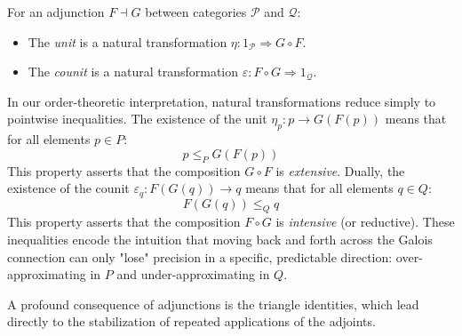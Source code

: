 \begin{definition}
For an adjunction $F \dashv G$ between categories $\mathcal{P}$ and $\mathcal{Q}$:
\begin{itemize}
    \item The \emph{unit} is a natural transformation $\eta: 1_{\mathcal{P}} \Rightarrow G \circ F$.
    \item The \emph{counit} is a natural transformation $\varepsilon: F \circ G \Rightarrow 1_{\mathcal{Q}}$.
\end{itemize}
\end{definition}

In our order-theoretic interpretation, natural transformations reduce simply to pointwise inequalities. The existence of the unit $\eta_p: p \to G(F(p))$ means that for all elements $p \in P$:
\begin{equation}
\label{eq:unit_inequality}
p \leq_P G(F(p))
\end{equation}
This property asserts that the composition $G \circ F$ is \emph{extensive}. 
Dually, the existence of the counit $\varepsilon_q: F(G(q)) \to q$ means that for all elements $q \in Q$:
\begin{equation}
\label{eq:counit_inequality}
F(G(q)) \leq_Q q
\end{equation}
This property asserts that the composition $F \circ G$ is \emph{intensive} (or reductive). 
These inequalities encode the intuition that moving back and forth across the Galois connection can only "lose" precision in a specific, predictable direction: over-approximating in $P$ and under-approximating in $Q$.

A profound consequence of adjunctions is the triangle identities, which lead directly to the stabilization of repeated applications of the adjoints.


